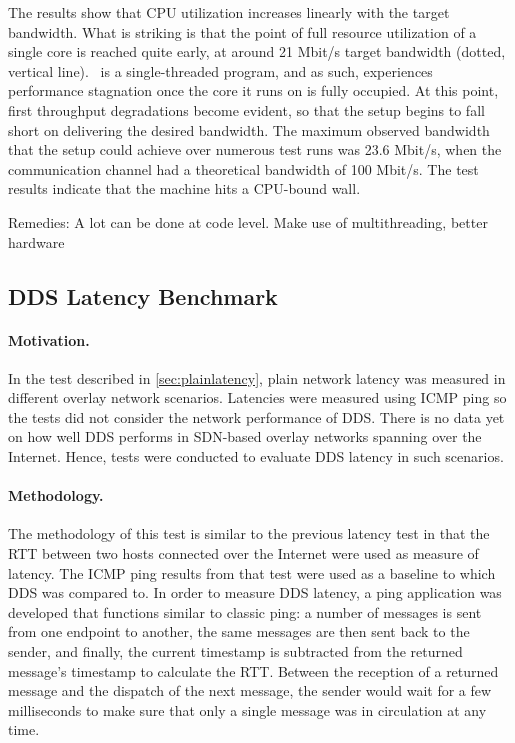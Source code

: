 The results show that CPU utilization increases linearly with the target bandwidth. What is striking is that the point of full resource utilization of a single core is reached quite early, at around 21 Mbit/s target bandwidth (dotted, vertical line). \wnet\ is a single-threaded program, and as such, experiences performance stagnation once the core it runs on is fully occupied. At this point, first throughput degradations become evident, so that the setup begins to fall short on delivering the desired bandwidth. The maximum observed bandwidth that the setup could achieve over numerous test runs was 23.6 Mbit/s, when the communication channel had a theoretical bandwidth of 100 Mbit/s. The test results indicate that the machine hits a CPU-bound wall.


Remedies: A lot can be done at code level. Make use of multithreading, better hardware
%
%
%
%
%
%
%
%
%
%

\subsection{DDS Latency Benchmark} \label{sec:ddslatency}

\paragraph{Motivation.} In the test described in \autoref{sec:plainlatency}, plain network latency was measured in different overlay network scenarios. Latencies were measured using ICMP ping so the tests did not consider the network performance of DDS. There is no data yet on how well DDS performs in SDN-based overlay networks spanning over the Internet. Hence, tests were conducted to evaluate DDS latency in such scenarios.

\paragraph{Methodology.} The methodology of this test is similar to the previous latency test in that the RTT between two hosts connected over the Internet were used as measure of latency. The ICMP ping results from that test were used as a baseline to which DDS was compared to. In order to measure DDS latency, a ping application was developed that functions similar to classic ping: a number of messages is sent from one endpoint to another, the same messages are then sent back to the sender, and finally, the current timestamp is subtracted from the returned message's timestamp to calculate the RTT. Between the reception of a returned message and the dispatch of the next message, the sender would wait for a few milliseconds to make sure that only a single message was in circulation at any time.

